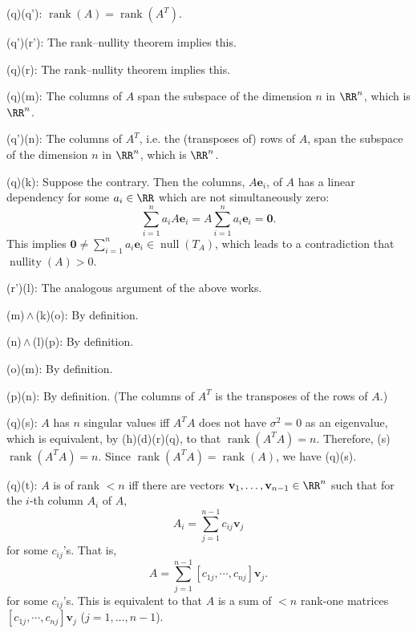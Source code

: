 \documentclass{homework}
\begin{document}
{\noindent(q)\eq(q'): $\operatorname{rank}(A) = \operatorname{rank}(A^T)$.

\noindent(q')\eq(r'): The rank--nullity theorem implies this.

\noindent(q)\eq(r): The rank--nullity theorem implies this.

\noindent(q)\impl(m): The columns of $A$ span the subspace of the dimension $n$ in $\RR^n$, which is $\RR^n$.

\noindent(q')\impl(n): The columns of $A^T$, i.e. the (transposes of) rows of $A$, span the subspace of the dimension $n$ in $\RR^n$, which is $\RR^n$.

\noindent(q)\impl(k): Suppose the contrary. Then the columns, $A\mathbf e_i$, of $A$ has a linear dependency for some $a_i\in\RR$ which are not simultaneously zero:
$$ \sum_{i=1}^n a_i A\mathbf e_i = A \sum_{i=1}^n a_i \mathbf e_i = \mathbf 0. $$
This implies $\mathbf 0\ne  \sum_{i=1}^n a_i \mathbf e_i\in \operatorname{null}(T_A)$, which leads to a contradiction that $\operatorname{nullity}(A)>0$.

\noindent(r')\impl(l): The analogous argument of the above works.

\noindent(m)\,$\land$\,(k)\impl(o): By definition.

\noindent(n)\,$\land$\,(l)\impl(p): By definition.

\noindent(o)\impl(m): By definition.

\noindent(p)\impl(n): By definition. (The columns of $A^T$ is the transposes of the rows of $A$.)

\noindent(q)\eq(s): $A$ has $n$ singular values iff $A^TA$ does not have $\sigma^2=0$ as an eigenvalue, which is equivalent, by (h)\eq(d)\eq(r)\eq(q), to that $\operatorname{rank}(A^TA) = n$. Therefore, (s)\eq $\operatorname{rank}(A^TA)=n$. Since $\operatorname{rank}(A^TA) = \operatorname{rank}(A)$, we have (q)\eq(s).

\noindent(q)\eq(t): $A$ is of rank $<n$ iff there are vectors $\mathbf v_1,\dots,\mathbf v_{n-1}\in\RR^n$ such that for the $i$-th column $A_i$ of $A$,
$$ A_i = \sum_{j=1}^{n-1} c_{ij}\mathbf v_j $$
for some $c_{ij}$'s. That is,
$$ A = \sum_{j=1}^{n-1} [c_{1j},\cdots, c_{nj}]\mathbf v_j. $$
for some $c_{ij}$'s. This is equivalent to that $A$ is a sum of $<n$ rank-one matrices $[c_{1j},\cdots,c_{nj}]\mathbf v_j$ ($j=1,\dots,n-1$).
}
\end{document}
